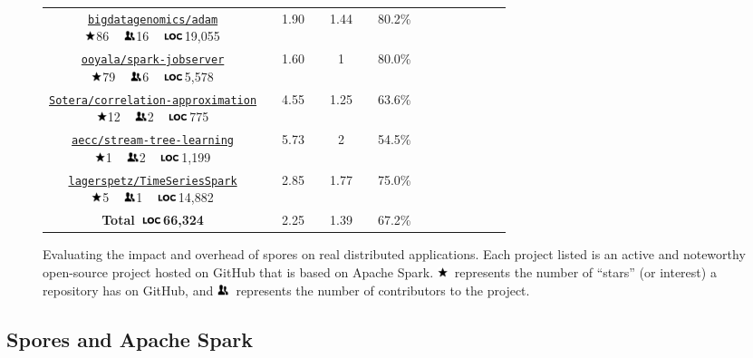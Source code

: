 \documentclass[runningheads]{llncs}
\newcommand{\myrowcolour}{\rowcolor[gray]{0.925}}
\newcommand*\loc{\includegraphics[height=0.65em,keepaspectratio]{loc}}
\newcommand*\stars{\includegraphics[height=0.8em,keepaspectratio]{stars}}
\newcommand*\contribs{\includegraphics[height=0.8em,keepaspectratio]{contribs}}
\begin{document}
\begin{sloppypar}
\begin{figure}[t!]
\begin{longtable}{c@{}c c@{}c c@{}c c@{}c c@{}c c@{}c c@{}c }
\parbox[c][0.75cm]{4cm}{\centering\normalsize\href{https://github.com/bigdatagenomics/adam}{\texttt{bigdatagenomics/adam}}\\ \stars 86 ~ \contribs 16 ~ \loc 19,055} && 1.90 && 1.44 && 80.2\% \\

\myrowcolour%
\parbox[c][0.75cm]{4cm}{\centering\normalsize\href{https://github.com/ooyala/spark-jobserver}{\texttt{ooyala/spark-jobserver}}\\ \stars 79 ~ \contribs 6 ~ \loc 5,578} && 1.60 && 1 && 80.0\% \\

\parbox[c][0.75cm]{5cm}{\centering\normalsize\href{https://github.com/Sotera/correlation-approximation}{\texttt{Sotera/correlation-approximation}}\\ \stars 12 ~ \contribs 2 ~ \loc 775} && 4.55 && 1.25 && 63.6\% \\

\myrowcolour%
\parbox[c][0.75cm]{4cm}{\centering\normalsize\href{https://github.com/aecc/stream-tree-learning}{\texttt{aecc/stream-tree-learning}}\\ \stars 1 ~ \contribs 2 ~ \loc 1,199} && 5.73 && 2 && 54.5\% \\

\parbox[c][0.75cm]{5cm}{\centering\normalsize\href{https://github.com/lagerspetz/TimeSeriesSpark}{\texttt{lagerspetz/TimeSeriesSpark}}\\ \stars 5 ~ \contribs 1 ~ \loc 14,882} && 2.85 && 1.77 && 75.0\% \\

\bottomrule

\textbf{Total~\loc 66,324} && 2.25 && 1.39 && 67.2\% \\

\bottomrule

\end{longtable}
\vspace{2mm}
\caption{Evaluating the impact and overhead of spores on real distributed applications. Each project listed is an active and noteworthy open-source project hosted on GitHub that is based on Apache Spark. \protect\stars~represents the number of ``stars'' (or interest) a repository has on GitHub, and \protect\contribs~represents the number of contributors to the project.}
\label{fig:spark-apps-stats}
\vspace{-5mm}
\end{figure}


\subsection{Spores and Apache Spark}


\end{sloppypar}
\end{document}
